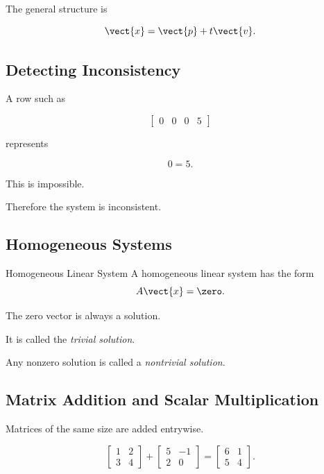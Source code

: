 The general structure is

\[ \vect{x}=\vect{p}+t\vect{v}. \]

\subsection{Detecting Inconsistency}
\label{subsec:detecting-inconsistency}

A row such as

\[ \left[\begin{array}{ccc|c}0&0&0&5\end{array}\right] \]

represents

\[ 0=5. \]

This is impossible.

Therefore the system is inconsistent.

\subsection{Homogeneous Systems}
\label{subsec:homogeneous-systems}

\begin{definitionbox}{Homogeneous Linear System}
A homogeneous linear system has the form
\[ A\vect{x}=\zero. \]
\end{definitionbox}

The zero vector is always a solution.

It is called the \emph{trivial solution}.

Any nonzero solution is called a \emph{nontrivial solution}.

\subsection{Matrix Addition and Scalar Multiplication}
\label{subsec:matrix-addition-scalar}

Matrices of the same size are added entrywise.

\[ \begin{bmatrix}1&2\\3&4\end{bmatrix}
+\begin{bmatrix}5&-1\\2&0\end{bmatrix}
=
\begin{bmatrix}6&1\\5&4\end{bmatrix}. \]

